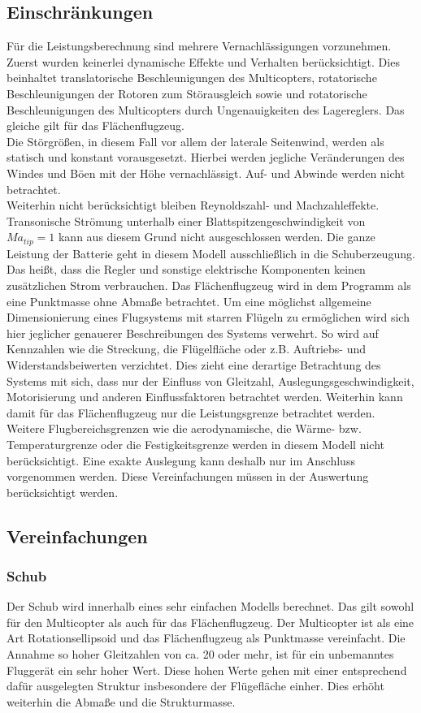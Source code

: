 \subsection{Einschränkungen}
Für die Leistungsberechnung sind mehrere Vernachlässigungen vorzunehmen. Zuerst wurden keinerlei dynamische Effekte und Verhalten berücksichtigt. Dies beinhaltet translatorische Beschleunigungen des Multicopters, rotatorische Beschleunigungen der Rotoren zum Störausgleich sowie und rotatorische Beschleunigungen des Multicopters durch Ungenauigkeiten des Lagereglers. Das gleiche gilt für das Flächenflugzeug. \\
Die Störgrößen, in diesem Fall vor allem der laterale Seitenwind, werden als statisch und konstant vorausgesetzt. Hierbei werden jegliche Veränderungen des Windes und Böen mit der Höhe vernachlässigt. Auf- und Abwinde werden nicht betrachtet. \\
Weiterhin nicht berücksichtigt bleiben Reynoldszahl- und Machzahleffekte. Transonische Strömung unterhalb einer Blattspitzengeschwindigkeit von \ensuremath{Ma_{tip}=1} kann aus diesem Grund nicht ausgeschlossen werden.
Die ganze Leistung der Batterie geht in diesem Modell ausschließlich in die Schuberzeugung. Das heißt, dass die Regler und sonstige elektrische Komponenten keinen zusätzlichen Strom verbrauchen.
Das Flächenflugzeug wird in dem Programm als eine Punktmasse ohne Abmaße betrachtet. Um eine möglichst allgemeine Dimensionierung eines Flugsystems mit starren Flügeln zu ermöglichen wird sich hier jeglicher genauerer Beschreibungen des Systems verwehrt. So wird auf Kennzahlen wie die Streckung, die Flügelfläche oder z.B. Auftriebs- und Widerstandsbeiwerten verzichtet. Dies zieht eine derartige Betrachtung des Systems mit sich, dass nur der Einfluss von Gleitzahl, Auslegungsgeschwindigkeit, Motorisierung und anderen Einflussfaktoren betrachtet werden. Weiterhin kann damit für das Flächenflugzeug nur die Leistungsgrenze betrachtet werden. Weitere Flugbereichsgrenzen wie die aerodynamische, die Wärme- bzw. Temperaturgrenze oder die Festigkeitsgrenze werden in diesem Modell nicht berücksichtigt. 
Eine exakte Auslegung kann deshalb nur im Anschluss vorgenommen werden. Diese Vereinfachungen müssen in der Auswertung berücksichtigt werden.

\subsection{Vereinfachungen}
\subsubsection{Schub}
Der Schub wird innerhalb eines sehr einfachen Modells berechnet. Das gilt sowohl für den Multicopter als auch für das Flächenflugzeug. Der Multicopter ist als eine Art Rotationsellipsoid und das Flächenflugzeug als Punktmasse vereinfacht. Die Annahme so hoher Gleitzahlen von ca. 20 oder mehr, ist für ein unbemanntes Fluggerät ein sehr hoher Wert. Diese hohen Werte gehen mit einer entsprechend dafür ausgelegten Struktur insbesondere der Flügefläche einher. Dies erhöht weiterhin die Abmaße und die Strukturmasse.

